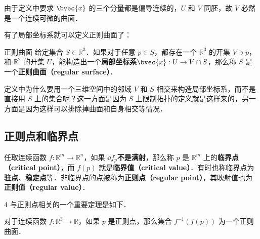由于定义中要求 $\bvec{x}$ 的三个分量都是偏导连续的，$U$ 和 $V$ 同胚，故 $V$ 必然是一个连续可微的曲面．

有了局部坐标系就可以定义正则曲面了：

\begin{definition}{正则曲面}
给定集合 $S\in\mathbb{R}^3$．如果对于任意 $p\in S$，都存在一个 $\mathbb{R}^3$ 的开集 $V\ni p$，和 $\mathbb{R}^2$ 的开集 $U$，能构造出一个\textbf{局部坐标系}$\bvec{x}:U\to V\cap S$，那么称 $S$ 是一个\textbf{正则曲面（regular surface）}．
\end{definition}

定义中为什么要用一个三维空间中的邻域 $V$ 和 $S$ 相交来构造局部坐标系，而不是直接用 $S$ 上的集合呢？这一方面是因为 $S$ 上限制拓扑的定义就是这样来的，另一方面是因为这样可以排除掉曲面和自身相交等情况．

\subsection{正则点和临界点}

\begin{definition}{}
任取连续函数 $f:\mathbb{R}^m\to\mathbb{R}^n$，如果 $\dd f_p$\textbf{不是满射}，那么称 $p$ 是 $\mathbb{R}^m$ 上的\textbf{临界点（critical point）}，而 $f(p)$ 就是\textbf{临界值（critical value）}．有时也称临界点为\textbf{驻点}、\textbf{稳定点}等．非临界点的点被称为\textbf{正则点（regular point）}，其映射值也为\textbf{正则值（regular value）}．
\end{definition}
4
与正则点相关的一个重要定理是如下．

\begin{theorem}{}
对于连续函数 $f:\mathbb{R}^3\to\mathbb{R}$，如果 $p$ 是正则点，那么集合 $f^{-1}(f(p))$ 为一个正则曲面．
\end{theorem}


